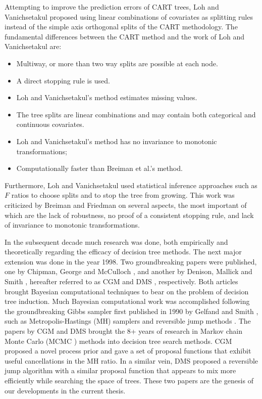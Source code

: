 Attempting to improve the prediction errors of CART trees, Loh and Vanichsetakul proposed using linear combinations of covariates as splitting rules instead of the simple axis orthogonal splits of the CART methodology. The fundamental differences between the CART method and the work of Loh and Vanichsetakul \cite{loh1988tree} are: 

\begin{itemize}
\item Multiway, or more than two way splits are possible at each node.
\item A direct stopping rule is used. 
\item Loh and Vanichsetakul's method estimates missing values. 
\item The tree splits are linear combinations and may contain both categorical and continuous covariates.
\item Loh and Vanichsetakul's method has no invariance to monotonic transformations; 
\item Computationally faster than Breiman et al.'s method. 
\end{itemize}

Furthermore, Loh and Vanichsetakul used statistical inference approaches such as $F$ ratios to choose splits and to stop the tree from growing. This work was criticized by Breiman and Friedman  \cite{breiman1988comment} on several aspects, the most important of which are the lack of robustness, no proof of a consistent stopping rule, and lack of invariance to monotonic transformations. 

In the subsequent decade much research was done, both empirically and theoretically regarding the efficacy of decision tree methods. The next major extension was done in the year 1998. Two groundbreaking papers were published, one by Chipman, George and McCulloch \cite{chipman1998bayesian}, and another by Denison, Mallick and Smith \cite{denison1998bayesian}, hereafter referred to as CGM and DMS , respectively. Both articles brought Bayesian computational techniques to bear on the problem of decision tree induction. Much Bayesian computational work was accomplished following the groundbreaking Gibbs sampler first published in 1990 by Gelfand and Smith \cite{gelfand1990sampling}, such as Metropolis-Hastings (MH) samplers \cite{hastings1970monte,robert1999monte} and reversible jump methods \cite{green1995reversible}. The papers by CGM and DMS brought the 8+ years of research in Markov chain Monte Carlo (MCMC \hspace{-.1cm}) methods into decision tree search methods. CGM proposed a novel process prior and gave a set of proposal functions that exhibit useful cancellations in the MH ratio. In a similar vein, DMS proposed a reversible jump algorithm with a similar proposal function that appears to mix more efficiently while searching the space of trees. These two papers are the genesis of our developments in the current thesis. 

